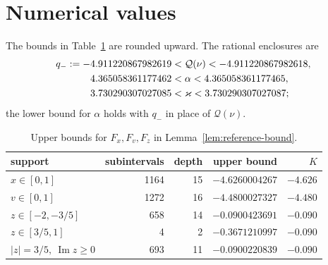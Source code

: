 \documentclass{amsart}
\numberwithin{equation}{section}
\numberwithin{table}{section}
\begin{document}
\section{Numerical values}\label{app:numerical}

The bounds in Table~\ref{tab:analytic-bounds} are rounded upward. The
rational enclosures are
\begin{align}
 q_-:=-4.911220867982619
 &<\mathcal Q(\nu)<
 -4.911220867982618,\label{eq:Q-enclosure}\\
 4.365058361177462
 &<\alpha<
 4.365058361177465,\label{eq:alpha-enclosure}\\
 3.730290307027085
 &<\varkappa<3.730290307027087;\notag
\end{align}
the lower bound for $\alpha$ holds with $q_-$ in place of $\mathcal Q(\nu)$.

\begin{table}[ht]
\centering\small
\caption{Upper bounds for $F_x,F_v,F_z$ in Lemma~\ref{lem:reference-bound}.}
\label{tab:analytic-bounds}
\begin{tabular}{lrrrr}
\hline
support&subintervals&depth&upper bound&$K$\\
\hline
$x\in[0,1]$ & 1164 & 15 & $-4.6260004267$ & $-4.626$\\
$v\in[0,1]$ & 1272 & 16 & $-4.4800027327$ & $-4.480$\\
$z\in[-2,-3/5]$ & 658 & 14 & $-0.0900423691$ & $-0.090$\\
$z\in[3/5,1]$ & 4 & 2 & $-0.3671210997$ & $-0.090$\\
$|z|=3/5,\ \operatorname{Im} z\ge0$ & 693 & 11 & $-0.0900220839$ & $-0.090$\\
\hline
\end{tabular}
\end{table}
\end{document}
